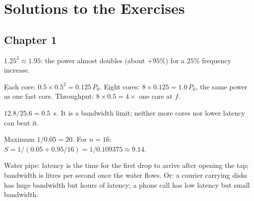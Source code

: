 \chapter{Solutions to the Exercises}
\label{app:solutions}

\section*{Chapter 1}
\begin{description}[leftmargin=1.2cm,labelwidth=1cm,itemsep=3pt]
  \item[1.1] $1.25^{3}\approx1.95$: the power almost doubles (about $+95\%$) for a $25\%$ frequency increase.
  \item[1.2] Each core: $0.5\times0.5^{2}=0.125\,P_0$. Eight cores: $8\times0.125=1.0\,P_0$, the same power as one fast core. Throughput: $8\times0.5=4\times$ one core at $f$.
  \item[1.3] $12.8/25.6=0.5$~s. It is a bandwidth limit; neither more cores nor lower latency can beat it.
  \item[1.4] Maximum $1/0.05=20$. For $n=16$: $S=1/(0.05+0.95/16)=1/0.109375\approx9.14$.
  \item[1.5] Water pipe: latency is the time for the first drop to arrive after opening the tap; bandwidth is litres per second once the water flows. Or: a courier carrying
        disks has huge bandwidth but hours of latency; a phone call has low latency but small bandwidth.
\end{description}

